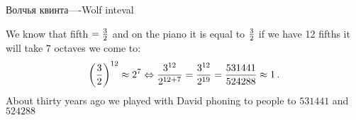 

    Волчья квинта----Wolf inteval


   We know that fifth $={3\over 2}$ and on the piano
 it is equal to ${3\over 2} $
if we have 12 fifths it will take 7 octaves we come to:
              $$
  \left(3\over 2\right)^{12}\approx 2^7\Leftrightarrow
   {3^{12}\over 2^{12+7}}=
   {3^{12}\over 2^{19}}={531441\over 524288}\approx 1\,.
              $$
About thirty years  ago we played with David phoning to 
people to $531441$ and $524288$ 
\bye
